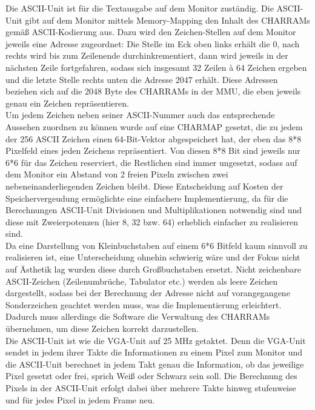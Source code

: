 Die ASCII-Unit ist f\"ur die Textausgabe auf dem Monitor zust\"andig.
Die ASCII-Unit gibt auf dem Monitor mittels Memory-Mapping den Inhalt des CHARRAMs gem{\"a}{\ss} ASCII-Kodierung aus. Dazu wird den Zeichen-Stellen auf dem Monitor jeweils eine Adresse zugeordnet: Die Stelle im Eck oben links erh\"alt die 0, nach rechts wird bis zum Zeilenende durchinkrementiert, dann wird jeweils in der n\"achsten Zeile fortgefahren, sodass sich insgesamt 32 Zeilen \`a 64 Zeichen ergeben und die letzte Stelle rechts unten die Adresse 2047 erh\"alt. Diese Adressen beziehen sich auf die 2048 Byte des CHARRAMs in der MMU, die eben jeweils genau ein Zeichen repr\"asentieren.\\
Um jedem Zeichen neben seiner ASCII-Nummer auch das entsprechende Aussehen zuordnen zu k\"onnen wurde auf eine CHARMAP gesetzt, die zu jedem der 256 ASCII Zeichen einen 64-Bit-Vektor abgespeichert hat, der eben das 8*8 Pixelfeld eines jeden Zeichens repr\"asentiert. Von diesen 8*8 Bit sind jeweils nur 6*6 f\"ur das Zeichen reserviert, die Restlichen sind immer ungesetzt, sodass auf dem Monitor ein Abstand von 2 freien Pixeln zwischen zwei nebeneinanderliegenden Zeichen bleibt. Diese Entscheidung auf Kosten der Speichervergeudung erm\"oglichte eine einfachere Implementierung, da f\"ur die Berechnungen ASCII-Unit Divisionen und Multiplikationen notwendig sind und diese mit Zweierpotenzen (hier 8, 32 bzw. 64) erheblich einfacher zu realisieren sind.\\
Da eine Darstellung von Kleinbuchstaben auf einem 6*6 Bitfeld kaum sinnvoll zu realisieren ist, eine Unterscheidung ohnehin schwierig w\"are und der Fokus nicht auf \"Asthetik lag wurden diese durch Gro{\ss}buchstaben ersetzt.
Nicht zeichenbare ASCII-Zeichen (Zeilenumbr\"uche, Tabulator etc.) werden als leere Zeichen dargestellt, sodass bei der Berechnung der Adresse nicht auf vorangegangene Sonderzeichen geachtet werden muss, was die Implementierung erleichtert. Dadurch muss allerdings die Software die Verwaltung des CHARRAMs \"ubernehmen, um diese Zeichen korrekt darzustellen.\\
Die ASCII-Unit ist wie die VGA-Unit auf 25 MHz getaktet. Denn die VGA-Unit sendet in jedem ihrer Takte die Informationen zu einem Pixel zum Monitor und die ASCII-Unit berechnet in jedem Takt genau die Information, ob das jeweilige Pixel gesetzt oder frei, sprich Wei{\ss} oder Schwarz sein soll. Die Berechnung des Pixels in der ASCII-Unit erfolgt dabei \"uber mehrere Takte hinweg stufenweise und f\"ur jedes Pixel in jedem Frame neu.\\


